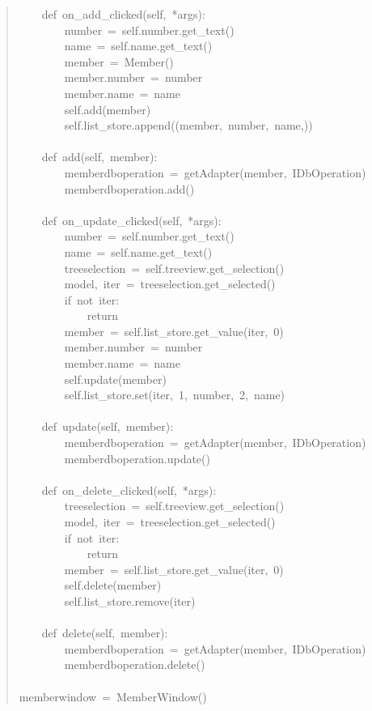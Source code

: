 \documentclass[14pt,a4paper,openany,twoside,final]{extbook}
\begin{document}
\begin{quote}
{~~~~def~on\_add\_clicked(self,~*args):\\
~~~~~~~~number~=~self.number.get\_text()\\
~~~~~~~~name~=~self.name.get\_text()\\
~~~~~~~~member~=~Member()\\
~~~~~~~~member.number~=~number\\
~~~~~~~~member.name~=~name\\
~~~~~~~~self.add(member)\\
~~~~~~~~self.list\_store.append((member,~number,~name,))\\
~\\
~~~~def~add(self,~member):\\
~~~~~~~~memberdboperation~=~getAdapter(member,~IDbOperation)\\
~~~~~~~~memberdboperation.add()\\
~\\
~~~~def~on\_update\_clicked(self,~*args):\\
~~~~~~~~number~=~self.number.get\_text()\\
~~~~~~~~name~=~self.name.get\_text()\\
~~~~~~~~treeselection~=~self.treeview.get\_selection()\\
~~~~~~~~model,~iter~=~treeselection.get\_selected()\\
~~~~~~~~if~not~iter:\\
~~~~~~~~~~~~return\\
~~~~~~~~member~=~self.list\_store.get\_value(iter,~0)\\
~~~~~~~~member.number~=~number\\
~~~~~~~~member.name~=~name\\
~~~~~~~~self.update(member)\\
~~~~~~~~self.list\_store.set(iter,~1,~number,~2,~name)\\
~\\
~~~~def~update(self,~member):\\
~~~~~~~~memberdboperation~=~getAdapter(member,~IDbOperation)\\
~~~~~~~~memberdboperation.update()\\
~\\
~~~~def~on\_delete\_clicked(self,~*args):\\
~~~~~~~~treeselection~=~self.treeview.get\_selection()\\
~~~~~~~~model,~iter~=~treeselection.get\_selected()\\
~~~~~~~~if~not~iter:\\
~~~~~~~~~~~~return\\
~~~~~~~~member~=~self.list\_store.get\_value(iter,~0)\\
~~~~~~~~self.delete(member)\\
~~~~~~~~self.list\_store.remove(iter)\\
~\\
~~~~def~delete(self,~member):\\
~~~~~~~~memberdboperation~=~getAdapter(member,~IDbOperation)\\
~~~~~~~~memberdboperation.delete()\\
~\\
memberwindow~=~MemberWindow()
}
\end{quote}
\end{document}
